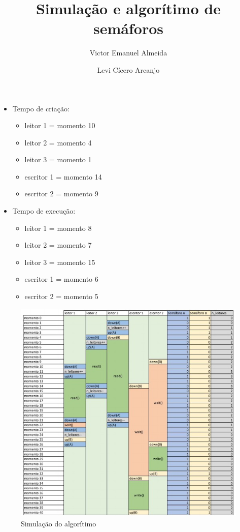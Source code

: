 \documentclass[12pt, a4paper]{article}
\author{Victor Emanuel Almeida \and Levi Cícero Arcanjo}
\title{Simulação e algorítimo de semáforos}
\begin{document}
\maketitle\thispagestyle{fancy}
\begin{itemize}
	\item Tempo de criação:
	\begin{itemize}
			\item leitor 1 = momento 10
			\item leitor 2 = momento 4
			\item leitor 3 = momento 1
			\item escritor 1 = momento 14
			\item escritor 2 = momento 9
	\end{itemize}
	\item Tempo de execução:
		\begin{itemize}
			\item leitor 1 = momento 8
			\item leitor 2 = momento 7
			\item leitor 3 = momento 15
			\item escritor 1 = momento 6
			\item escritor 2 = momento 5
		\end{itemize}
\end{itemize}
	 
\begin{figure}[!htb]
	\centering
	\includegraphics[keepaspectratio, width=\textwidth]{tabela.jpeg}
	\caption{\label{fig:tabela.pdf} Simulação do algorítimo}
\end{figure}
\end{document}
